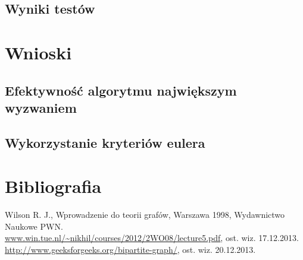 \documentclass[a4 122pt]{article}
\begin{document}
	\subsection{Wyniki testów}

\section{Wnioski}

	\subsection{Efektywność algorytmu największym wyzwaniem}
	\subsection{Wykorzystanie kryteriów eulera}

\section{Bibliografia}

		Wilson R. J., Wprowadzenie do teorii grafów, Warszawa 1998, Wydawnictwo Naukowe PWN.\\[0.3cm]
		\url{www.win.tue.nl/~nikhil/courses/2012/2WO08/lecture5.pdf}, ost. wiz. 17.12.2013.\\[0.3cm]
		\url{http://www.geeksforgeeks.org/bipartite-graph/}, ost. wiz. 20.12.2013.
\end{document}
